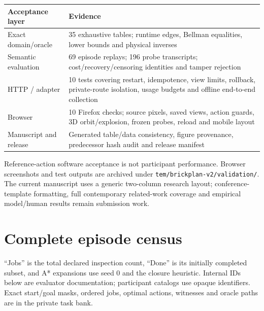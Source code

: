 \begin{center}\small
\begin{tabular}{p{}p{}}\toprule
Acceptance layer & Evidence\\\midrule
Exact domain/oracle & 35 exhaustive tables; runtime edges, Bellman equalities, lower bounds and physical inverses\\
Semantic evaluation & 69 episode replays; 196 probe transcripts; cost/recovery/censoring identities and tamper rejection\\
HTTP / adapter & 10 tests covering restart, idempotence, view limits, rollback, private-route isolation, usage budgets and offline end-to-end collection\\
Browser & 10 Firefox checks; source pixels, saved views, action guards, 3D orbit/explosion, frozen probes, reload and mobile layout\\
Manuscript and release & Generated table/data consistency, figure provenance, predecessor hash audit and release manifest\\\bottomrule
\end{tabular}
\end{center}
Reference-action software acceptance is not participant performance.
Browser screenshots and test outputs are archived under
\texttt{tem/brickplan-v2/validation/}. The current manuscript uses a
generic two-column research layout; conference-template formatting,
full contemporary related-work coverage and empirical model/human
results remain submission work.

\section{Complete episode census}
``Jobs'' is the total declared inspection count, ``Done'' is its initially
completed subset, and A* expansions use seed 0 and the closure heuristic.
Internal IDs below are evaluator documentation; participant catalogs use
opaque identifiers. Exact start/goal masks, ordered jobs, optimal actions,
witnesses and oracle paths are in the private task bank.
\small

\normalsize
